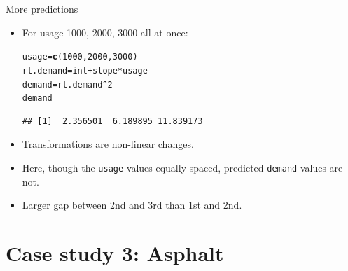 \documentclass[unknownkeysallowed]{beamer}\usepackage[]{graphicx}\usepackage[]{color}
\makeatletter
\newcommand{\hlnum}[1]{\textcolor[rgb]{0.686,0.059,0.569}{#1}}%
\newcommand{\hlopt}[1]{\textcolor[rgb]{0,0,0}{#1}}%
\newcommand{\hlstd}[1]{\textcolor[rgb]{0.345,0.345,0.345}{#1}}%
\newcommand{\hlkwb}[1]{\textcolor[rgb]{0.69,0.353,0.396}{#1}}%
\newcommand{\hlkwd}[1]{\textcolor[rgb]{0.737,0.353,0.396}{\textbf{#1}}}%
\newenvironment{kframe}{%
 \def\at@end@of@kframe{}%
 \ifinner\ifhmode%
  \def\at@end@of@kframe{\end{minipage}}%
  \begin{minipage}{\columnwidth}%
 \fi\fi%
 \def\FrameCommand##1{\hskip\@totalleftmargin \hskip-\fboxsep
 \colorbox{shadecolor}{##1}\hskip-\fboxsep
     \hskip-\linewidth \hskip-\@totalleftmargin \hskip\columnwidth}%
 \MakeFramed {\advance\hsize-\width
   \@totalleftmargin\z@ \linewidth\hsize
   \@setminipage}}%
 {\par\unskip\endMakeFramed%
 \at@end@of@kframe}
\newenvironment{knitrout}{}{} %
\makeatother
\begin{document}
\begin{frame}[fragile]{More predictions}

  \begin{itemize}
  \item For usage 1000, 2000, 3000 all at once:
\begin{knitrout}
\color{fgcolor}\begin{kframe}
\begin{alltt}
\hlstd{usage}\hlkwb{=}\hlkwd{c}\hlstd{(}\hlnum{1000}\hlstd{,}\hlnum{2000}\hlstd{,}\hlnum{3000}\hlstd{)}
\hlstd{rt.demand}\hlkwb{=}\hlstd{int}\hlopt{+}\hlstd{slope}\hlopt{*}\hlstd{usage}
\hlstd{demand}\hlkwb{=}\hlstd{rt.demand}\hlopt{^}\hlnum{2}
\hlstd{demand}
\end{alltt}
\begin{verbatim}
## [1]  2.356501  6.189895 11.839173
\end{verbatim}
\end{kframe}
\end{knitrout}
\item Transformations are non-linear changes.
\item Here, though the \texttt{usage} values equally spaced, predicted
  \texttt{demand} values are not.
\item Larger gap between 2nd and 3rd than 1st and 2nd.
  \end{itemize}

\end{frame}

\section{Case study 3: Asphalt}

\frame{\sectionpage}
\end{document}

